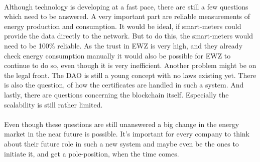 \documentclass{scrartcl}
\begin{document}
	\paragraph{}
	Although technology is developing at a fast pace, there are still a few questions which need to be answered. A very important part are reliable measurements of energy production and consumption. It would be ideal, if smart-meters could provide the data directly to the network. But to do this, the smart-meters would need to be 100\% reliable. As the trust in EWZ is very high, and they already check energy consumption manually it would also be possible for EWZ to continue to do so, even though it is very inefficient. Another problem might be on the legal front. The DAO is still a young concept with no laws existing yet. There is also the question, of how the certificates are handled in such a system. And lastly, there are questions concerning the blockchain itself. Especially the scalability is still rather limited.
	
	\paragraph{}
	Even though these questions are still unanswered a big change in the energy market in the near future is possible. It's important for every company to think about their future role in such a new system and maybe even be the ones to initiate it, and get a pole-position, when the time comes. 
    
\end{document}
